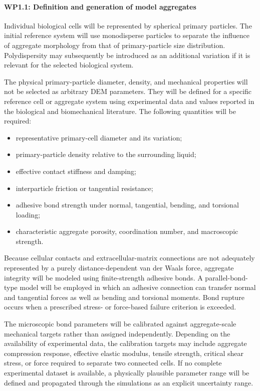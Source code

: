 \documentclass[11pt,a4paper,twoside]{scrartcl}
\begin{document}
\paragraph{WP1.1: Definition and generation of model aggregates}

Individual biological cells will be represented by spherical primary particles. The initial reference system will use monodisperse particles to separate the influence of aggregate morphology from that of primary-particle size distribution. Polydispersity may subsequently be introduced as an additional variation if it is relevant for the selected biological system.

The physical primary-particle diameter, density, and mechanical properties will not be selected as arbitrary DEM parameters. They will be defined for a specific reference cell or aggregate system using experimental data and values reported in the biological and biomechanical literature. The following quantities will be required:

\begin{itemize}
	\item representative primary-cell diameter and its variation;
	
	\item primary-particle density relative to the surrounding liquid;
	
	\item effective contact stiffness and damping;
	
	\item interparticle friction or tangential resistance;
	
	\item adhesive bond strength under normal, tangential, bending, and torsional loading;
	
	\item characteristic aggregate porosity, coordination number, and macroscopic strength.
\end{itemize}

Because cellular contacts and extracellular-matrix connections are not adequately represented by a purely distance-dependent van der Waals force, aggregate integrity will be modeled using finite-strength adhesive bonds. A parallel-bond-type model will be employed in which an adhesive connection can transfer normal and tangential forces as well as bending and torsional moments. Bond rupture occurs when a prescribed stress- or force-based failure criterion is exceeded.

The microscopic bond parameters will be calibrated against aggregate-scale mechanical targets rather than assigned independently. Depending on the availability of experimental data, the calibration targets may include aggregate compression response, effective elastic modulus, tensile strength, critical shear stress, or force required to separate two connected cells. If no complete experimental dataset is available, a physically plausible parameter range will be defined and propagated through the simulations as an explicit uncertainty range.
\end{document}
